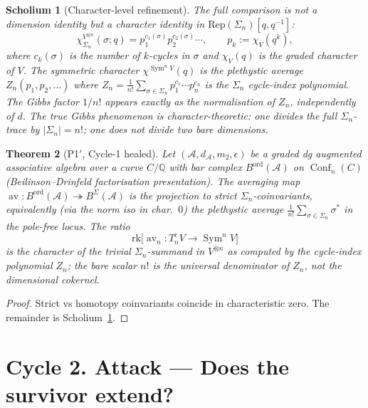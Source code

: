 \documentclass[11pt]{article}
\newtheorem{theorem}{Theorem}
\newtheorem{scholium}[theorem]{Scholium}
\theoremstyle{definition}
\DeclareMathOperator{\Conf}{Conf}
\DeclareMathOperator{\Sym}{Sym}
\DeclareMathOperator{\av}{av}
\newcommand{\ord}{\mathrm{ord}}
\begin{document}
\begin{scholium}[Character-level refinement]\label{sch:char-refinement}
The full comparison is not a dimension identity but a character
identity in $\mathrm{Rep}(\Sigma_n)[q, q^{-1}]$:
\[
\chi^{V^{\otimes n}}_{\Sigma_n}(\sigma; q) = p^{c_1(\sigma)}_1 p^{c_2(\sigma)}_2 \cdots,
\qquad
p_k := \chi_V(q^k),
\]
where $c_k(\sigma)$ is the number of $k$-cycles in $\sigma$ and $\chi_V(q)$
is the graded character of $V$. The symmetric character
$\chi^{\Sym^n V}(q)$ is the plethystic average
$Z_n(p_1, p_2, \dots)$ where $Z_n = \frac{1}{n!}\sum_{\sigma\in \Sigma_n}
p_1^{c_1}\cdots p_n^{c_n}$ is the $\Sigma_n$ cycle-index polynomial.
The Gibbs factor $1/n!$ appears exactly as the normalisation of
$Z_n$, independently of $d$. \emph{The true Gibbs phenomenon is
character-theoretic: one divides the full $\Sigma_n$-trace by $|\Sigma_n| = n!$;
one does not divide two bare dimensions.}
\end{scholium}

\begin{theorem}[P1$'$, Cycle-1 healed]\label{thm:p1-cycle1}
Let $(\mathcal{A}, d_\mathcal{A}, m_2, \epsilon)$ be a graded dg augmented
associative algebra over a curve $C/\mathbb{Q}$ with bar complex
$B^{\ord}(\mathcal{A})$ on $\Conf_n(C)$ (Beilinson--Drinfeld factorisation
presentation). The averaging map
$\av: B^{\ord}(\mathcal{A}) \twoheadrightarrow B^{\Sigma}(\mathcal{A})$
is the projection to strict $\Sigma_n$-coinvariants, equivalently
(via the norm iso in char.\ $0$) the plethystic average
$\frac{1}{n!}\sum_{\sigma\in\Sigma_n}\sigma^*$ in the pole-free locus.
The ratio
\[
\mathrm{rk}\bigl[\av_n: T^c_n V \to \Sym^n V\bigr]
\]
is the character of the trivial $\Sigma_n$-summand in $V^{\otimes n}$
as computed by the cycle-index polynomial $Z_n$; the bare scalar $n!$
is the universal denominator of $Z_n$, not the dimensional cokernel.
\end{theorem}

\begin{proof}
Strict vs homotopy coinvariants coincide in characteristic zero. The
remainder is Scholium~\ref{sch:char-refinement}.
\end{proof}

\section*{Cycle 2. Attack --- Does the survivor extend?}
\end{document}
